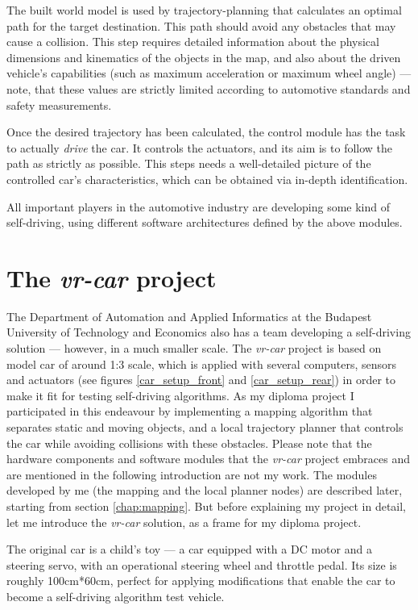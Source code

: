 The built world model is used by trajectory-planning that calculates an optimal path for the target destination. This path should avoid any obstacles that may cause a collision. This step requires detailed information about the physical dimensions and kinematics of the objects in the map, and also about the driven vehicle's capabilities (such as maximum acceleration or maximum wheel angle) --- note, that these values are strictly limited according to automotive standards and safety measurements.

Once the desired trajectory has been calculated, the control module has the task to actually \textit{drive} the car. It controls the actuators, and its aim is to follow the path as strictly as possible. This steps needs a well-detailed picture of the controlled car's characteristics, which can be obtained via in-depth identification.

All important players in the automotive industry are developing some kind of self-driving, using different software architectures defined by the above modules.

\section{The \textit{vr-car} project}
The Department of Automation and Applied Informatics at the Budapest University of Technology and Economics also has a team developing a self-driving solution --- however, in a much smaller scale. The \textit{vr-car} project is based on model car of around 1:3 scale, which is applied with several computers, sensors and actuators (see figures \ref{car_setup_front} and \ref{car_setup_rear}) in order to make it fit for testing self-driving algorithms. As my diploma project I participated in this endeavour by implementing a mapping algorithm that separates static and moving objects, and a local trajectory planner that controls the car while avoiding collisions with these obstacles. Please note that the hardware components and software modules that the \textit{vr-car} project embraces and are mentioned in the following introduction are not my work. The modules developed by me (the mapping and the local planner nodes) are described later, starting from section \ref{chap:mapping}. But before explaining my project in detail, let me introduce the \textit{vr-car} solution, as a frame for my diploma project.

The original car is a child's toy --- a car equipped with a DC motor and a steering servo, with an operational steering wheel and throttle pedal. Its size is roughly 100cm*60cm, perfect for applying modifications that enable the car to become a self-driving algorithm test vehicle.

